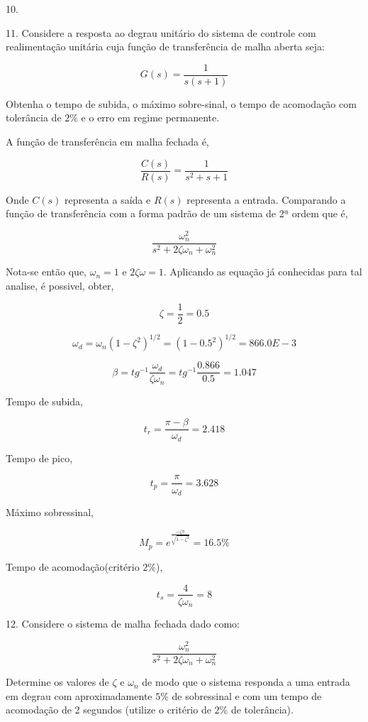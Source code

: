 \documentclass[paper=a4, fontsize=11pt]{article}
\begin{document}
10.

\newpage

11. Considere a resposta ao degrau unitário do sistema de controle com realimentação 
unitária cuja função de transferência de malha aberta seja:

$$
G(s) = \frac{1}{s(s+1)}
$$

Obtenha o tempo de subida, o máximo sobre-sinal, o tempo de acomodação com tolerância de
$2\%$ e o erro em regime permanente.


A função de transferência em malha fechada é,

$$
\frac{C(s)}{R(s)} = \frac{1}{s^2 + s + 1}
$$

Onde $C(s)$ representa a saída e $R(s)$ representa a entrada. Comparando a função de 
transferência com a forma padrão de um sistema de 2ª ordem que é,

$$
\frac{\omega_n^2}{s^2 + 2 \zeta \omega_n + \omega_n^2}
$$

Nota-se então que, $\omega_n = 1$ e $2 \zeta \omega = 1$. Aplicando as equação já conhecidas
para tal analise, é possivel, obter,

$$
\zeta = \frac{1}{2} = 0.5
$$

$$
\omega_d = \omega_n (1-\zeta^2)^{1/2} = (1 - 0.5^2)^{1/2} = 866.0E-3
$$

$$
\beta = tg^{-1}{\frac{\omega_d}{\zeta \omega_n}} = tg^{-1}{\frac{0.866}{0.5}} = 1.047
$$

Tempo de subida,

$$
t_r = \frac{\pi - \beta}{\omega_d} = 2.418
$$

Tempo de pico,

$$
t_p = \frac{\pi}{\omega_d} = 3.628
$$

Máximo sobressinal,

$$
M_p = e^{\frac{-\zeta \pi}{\sqrt{1-\zeta^2}} } = 16.5 \%
$$

Tempo de acomodação(critério $2\%$),

$$
t_s = \frac{4}{\zeta \omega_n} = 8
$$


\newpage

12. Considere o sistema de malha fechada dado como:

$$
\frac{\omega_n^2}{s^2 + 2 \zeta \omega_n + \omega_n^2}
$$

Determine os valores de $\zeta$ e $\omega_n$ de modo que o sistema responda a uma entrada em degrau
com aproximadamente $5\%$ de sobressinal e com um tempo de acomodação de 2 segundos
(utilize o critério de $2\%$ de tolerância).
\end{document}
